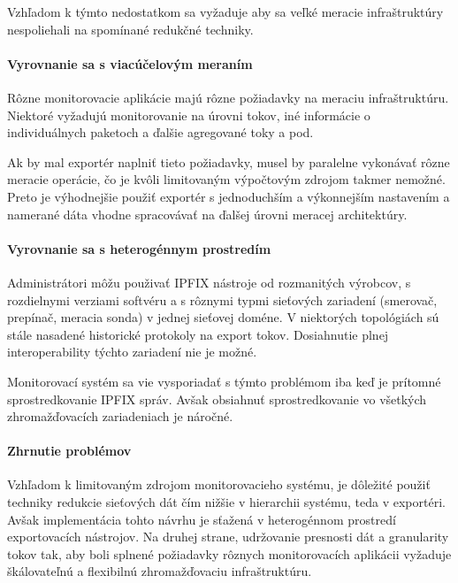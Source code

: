 Vzhľadom k týmto nedostatkom sa vyžaduje aby sa veľké meracie infraštruktúry nespoliehali na 
spomínané redukčné techniky.


\paragraph{Vyrovnanie sa s viacúčelovým meraním}

Rôzne monitorovacie aplikácie majú rôzne požiadavky na meraciu infraštruktúru. Niektoré vyžadujú 
monitorovanie na úrovni tokov, iné informácie o individuálnych paketoch a ďalšie agregované toky a pod.

Ak by mal exportér naplniť tieto požiadavky, musel by paralelne vykonávať rôzne meracie operácie, čo je
kvôli limitovaným výpočtovým zdrojom takmer nemožné. Preto je výhodnejšie použiť exportér s jednoduchším a 
výkonnejším nastavením a namerané dáta vhodne spracovávať na ďalšej úrovni meracej architektúry.



\paragraph{Vyrovnanie sa s heterogénnym prostredím}

Administrátori môžu použivať IPFIX nástroje od rozmanitých výrobcov, s rozdielnymi verziami softvéru a s 
rôznymi typmi sieťových zariadení (smerovač, prepínač, meracia sonda) v jednej sieťovej doméne.
V niektorých topológiách sú stále nasadené historické protokoly na export tokov. Dosiahnutie plnej 
interoperability týchto zariadení nie je možné.

Monitorovací systém sa vie vysporiadať s týmto problémom iba keď je prítomné sprostredkovanie IPFIX správ.
Avšak obsiahnuť sprostredkovanie vo všetkých zhromažďovacích zariadeniach je náročné.


\paragraph{Zhrnutie problémov}

Vzhľadom k limitovaným zdrojom monitorovacieho systému, je dôležité použiť techniky redukcie sieťových 
dát čím nižšie v hierarchii systému, teda v exportéri. Avšak implementácia tohto návrhu je sťažená v 
heterogénnom prostredí exportovacích nástrojov. 
Na druhej strane, udržovanie presnosti dát a granularity tokov tak, aby boli splnené požiadavky 
rôznych monitorovacích aplikácii vyžaduje škálovateľnú a flexibilnú zhromažďovaciu infraštruktúru.

